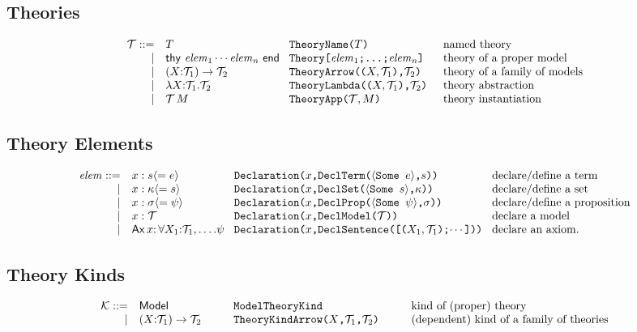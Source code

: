 \documentclass[12pt]{article}
\newcommand{\M}{M}
\newcommand{\e}{e}
\newcommand{\s}{s}
\newcommand{\X}{X} %
\newcommand{\n}{x} %
\newcommand{\p}{\psi} %
\newcommand{\pt}{\sigma} %
\newcommand{\x}{\n} %
\renewcommand{\k}{\kappa} %
\newcommand{\T}{\ensuremath{\mathcal T}}
\renewcommand{\t}{T}
\newcommand{\elem}{\mathit{elem}}
\newcommand{\tk}{\ensuremath{\mathcal K}}
\begin{document}
\subsection{Theories}

\[
\begin{array}{rl@{\hspace{0.3cm}}l@{\hspace{0.5cm}}l}
\T ::= & \t & \texttt{TheoryName($\t$)} & \mbox{named theory}\\
 |&\mathsf{thy}\ \elem_1 \cdots \elem_n\ \mathsf{end} &
     \texttt{Theory[$\elem_1$;\ldots;$\elem_n$]}& \mbox{theory of a proper model}\\
|&(\X{:}\T_1)\to\T_2&\texttt{TheoryArrow(($\X,\T_1$),$\T_2$)}&\mbox{theory of a family of models}\\
|&\lambda\X{:}\T_1.\T_2&\texttt{TheoryLambda(($\X,\T_1$),$\T_2$)}&\mbox{theory abstraction}\\
|&\T\,\M&\texttt{TheoryApp($\T,\M$)}&\mbox{theory instantiation}
\end{array}
\]

\subsection{Theory Elements}

\[
\begin{array}{rl@{\hspace{0.3cm}}l@{\hspace{0.3cm}}l}
\elem ::= &\x : \s \langle = \e\rangle & \texttt{Declaration($\x$,DeclTerm($\langle$Some $\e$$\rangle$,$\s$))} & \mbox{declare/define a term}\\
| &\n : \k \langle = \s\rangle & \texttt{Declaration($\n$,DeclSet($\langle$Some $\s$$\rangle$,$\k$))} & \mbox{declare/define a set}\\
| &\n : \pt \langle = \p\rangle & \texttt{Declaration($\n$,DeclProp($\langle$Some $\p$$\rangle$,$\pt$))} & \mbox{declare/define a proposition}\\
| &\n : \T& \texttt{Declaration($\n$,DeclModel($\T$))}&\mbox{declare a model}\\
| &\mathsf{Ax}\,\n{:}\, \forall \X_1{:}\T_1,\ldots.\p&
    \texttt{Declaration($\n$,DeclSentence([($\X_1,\T_1$);$\cdots$]))} &
    \mbox{declare an axiom}.
\end{array}
\]

\subsection{Theory Kinds}
\[
\begin{array}{rl@{\hspace{1cm}}l@{\hspace{1cm}}l}
\tk ::= & \mathsf{Model} & \texttt{ModelTheoryKind} & \mbox{kind of (proper) theory}\\
 |& (\X{:}\T_1)\to \T_2 & \texttt{TheoryKindArrow($\X$,$\T_1$,$\T_2$)} & \mbox{(dependent) kind of a family of theories}
\end{array}
\]
\end{document}
